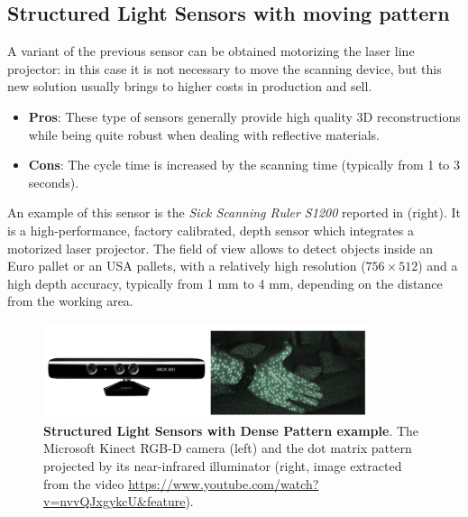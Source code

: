 \subsection{Structured Light Sensors with moving pattern}\label{subsec:sl_sensors_mp}
A variant of the previous sensor can be obtained motorizing the laser line projector: in this case it is not necessary to move the scanning device, but this new solution usually brings to higher costs in production and sell.

\begin{itemize}
	\item \textbf{Pros}: These type of sensors generally provide high quality 3D reconstructions while being quite robust when dealing with reflective materials.
	\item \textbf{Cons}: The cycle time is increased by the scanning time (typically from 1 to 3 seconds).
\end{itemize}

An example of this sensor is the \emph{Sick Scanning Ruler S1200} reported in  (right). It is a high-performance, factory calibrated, depth sensor which integrates a motorized laser projector. The field of view allows to detect objects inside an Euro pallet or an USA pallets, with a relatively high resolution ($756 \times 512$) and a high depth accuracy, typically from 1 mm to 4 mm, depending on the distance from the working area.

\begin{figure}
    \centering
    \includegraphics[width=0.85\textwidth]{figures/1_perception_and_sensing_in_robotics/sl_sensor_kinect1}
    \caption{\textbf{Structured Light Sensors with Dense Pattern example}. The Microsoft Kinect RGB-D camera (left) and the dot matrix pattern projected by its near-infrared illuminator (right, image extracted from the video ​\url{https://www.youtube.com/watch?v=nvvQJxgykcU&feature​}).} 
    \label{fig:sl_sensor_kinect1}
\end{figure}

